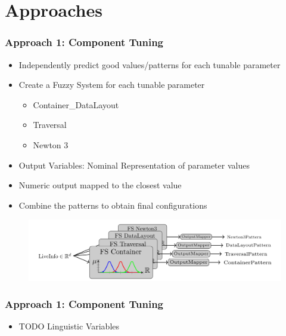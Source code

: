 \documentclass[
	10pt,
	t		%
]{beamer}
\begin{document}
\section{Approaches}
\begin{frame}
	\frametitle{Approach 1: Component Tuning}
	\begin{itemize}
		\item Independently predict good values/patterns for each tunable parameter
		\item Create a Fuzzy System for each tunable parameter
		      \begin{itemize}
			      \item Container\_DataLayout
			      \item Traversal
			      \item Newton 3
		      \end{itemize}
		\item Output Variables: Nominal Representation of parameter values
		\item Numeric output mapped to the closest value \cite{Mohammed2022}
		\item Combine the patterns to obtain final configurations
	\end{itemize}

	\begin{figure}
		\centering
		\includegraphics[width=1\textwidth]{figures/component-approach.png}
	\end{figure}

\end{frame}


\begin{frame}
	\frametitle{Approach 1: Component Tuning}
	\begin{itemize}
		\item TODO Linguistic Variables
	\end{itemize}

\end{frame}
\end{document}
